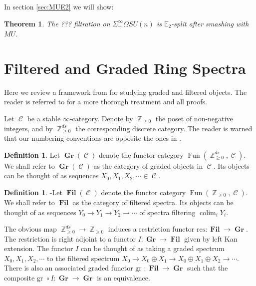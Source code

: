 \documentclass[oneside]{amsart}
\theoremstyle{definition}
\newtheorem{dfn}[nul]{Definition}
\theoremstyle{plain}
\newtheorem{thm}[nul]{Theorem}
\DeclareMathOperator*{\colim}{\text{colim}}
\DeclareMathOperator{\C}{\mathcal{C}}
\DeclareMathOperator{\Z}{\mathbb{Z}}
\DeclareMathOperator{\Gr}{\textbf{Gr}}
\DeclareMathOperator{\Fil}{\textbf{Fil}}
\DeclareMathOperator{\Fun}{\text{Fun}}
\begin{document}
In section \ref{sec:MUE2} we will show:
\begin{thm}
The ??? filtration on $\Sigma^{\infty}_+ \Omega SU(n)$ is $\mathbb{E}_2$-split after smashing with $MU$.
\end{thm}




\section{Filtered and Graded Ring Spectra} \label{sec:FilGra}


Here we review a framework from \cite{LurieRot} for studying graded and filtered objects.  The reader is referred to \cite{LurieRot} for a more thorough treatment and all proofs.  

Let $\C$ be a stable $\infty$-category.  Denote by $\Z_{\geq 0}$ the poset of non-negative integers, and by $\Z_{\geq 0}^{ds}$ the corresponding discrete category.  The reader is warned that our numbering conventions are opposite the ones in \cite{LurieRot}.

\begin{dfn} 
Let $\Gr(\C)$ denote the functor category $\Fun(\Z_{\geq 0}^{ds}, \C).$  We shall refer to $\Gr(\C)$ as the category of graded objects in $\C$.  Its objects can be thought of as sequences $X_0, X_1,X_2,\cdots \in \C$.
\end{dfn}

 \begin{dfn} 
-Let $\Fil(\C)$ denote the functor category $\Fun(\Z_{\geq 0}, \C).$  We shall refer to $\Fil$ as the category of filtered spectra.  Its objects can be thought of as sequences $Y_0\to Y_1\to Y_2 \to \cdots$ of spectra filtering $\colim_i Y_i$.  
 \end{dfn}

The obvious map $\Z_{\geq 0}^{ds} \to \Z_{\geq 0}$ induces a restriction functor $\text{res}: \Fil \to \Gr.$  The restriction is right adjoint to a functor $I: \Gr \to \Fil$ given by left Kan extension.  The functor $I$ can be thought of as taking a graded spectrum $X_0,X_1,X_2,\cdots$ to the filtered spectrum $X_0\to X_0\oplus X_1\to X_0\oplus X_1\oplus X_2\to \cdots.$    There is also an associated graded functor $\text{gr }: \Fil \to \Gr$ such that the composite $\text{gr }\circ I : \Gr \to \Gr$ is an equivalence.   
\end{document}
